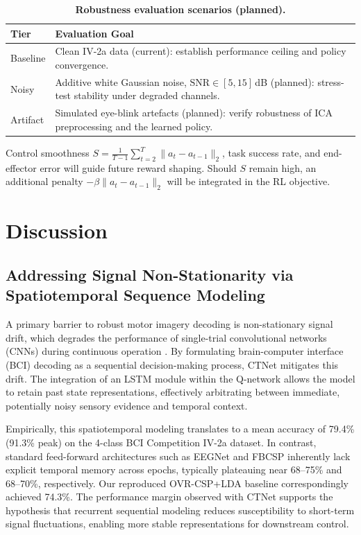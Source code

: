 \documentclass[twocolumn]{article}
\begin{document}
\begin{table}[t]
    \centering
    \caption{\textbf{Robustness evaluation scenarios (planned).}}
    \label{tab:eval_tiers}
    \renewcommand{\arraystretch}{1.12}
    \begin{tabular}{@{}p{} p{}@{}}
        \toprule
        Tier & Evaluation Goal \\
        \midrule
        Baseline & Clean IV-2a data (current): establish performance ceiling and policy convergence. \\
        Noisy & Additive white Gaussian noise, $\text{SNR}\in[5,15]$\,dB (planned): stress-test stability under degraded channels. \\
        Artifact & Simulated eye-blink artefacts (planned): verify robustness of ICA preprocessing and the learned policy. \\
        \bottomrule
    \end{tabular}
\end{table}

Control smoothness $S = \tfrac{1}{T-1}\sum_{t=2}^{T}\|a_t - a_{t-1}\|_2$, task success rate, and end-effector error will guide future reward shaping. Should $S$ remain high, an additional penalty $-\beta\|a_t - a_{t-1}\|_2$ will be integrated in the RL objective.

\section{Discussion}

\subsection{Addressing Signal Non-Stationarity via Spatiotemporal Sequence Modeling}

A primary barrier to robust motor imagery decoding is non-stationary signal drift, which degrades the performance of single-trial convolutional networks (CNNs) during continuous operation \cite{hameed2025enhancing, prev_student2024}. By formulating brain-computer interface (BCI) decoding as a sequential decision-making process, CTNet mitigates this drift. The integration of an LSTM module within the Q-network allows the model to retain past state representations, effectively arbitrating between immediate, potentially noisy sensory evidence and temporal context.

Empirically, this spatiotemporal modeling translates to a mean accuracy of 79.4\% (91.3\% peak) on the 4-class BCI Competition IV-2a dataset. In contrast, standard feed-forward architectures such as EEGNet and FBCSP inherently lack explicit temporal memory across epochs, typically plateauing near 68--75\% and 68--70\%, respectively. Our reproduced OVR-CSP+LDA baseline correspondingly achieved 74.3\%. The performance margin observed with CTNet supports the hypothesis that recurrent sequential modeling reduces susceptibility to short-term signal fluctuations, enabling more stable representations for downstream control.
\end{document}
